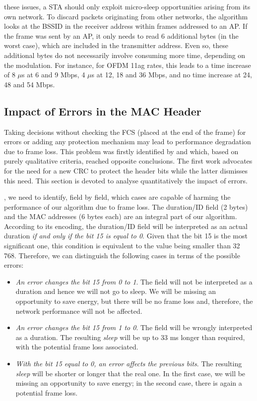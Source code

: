 \documentclass[twoside,nohyper]{tufte-book}
\providecommand{\tightlist}{%
  \setlength{\itemsep}{0pt}\setlength{\parskip}{0pt}}
\begin{document}
 these issues, a STA should only exploit micro-sleep opportunities arising from its own network. To discard packets originating from other networks, the algorithm looks at the BSSID in the receiver address within frames addressed to an AP. If the frame was sent by an AP, it only needs to read 6 additional bytes (in the worst case), which are included in the transmitter address. Even so, these additional bytes do not necessarily involve consuming more time, depending on the modulation. For instance, for OFDM 11ag rates, this leads to a time increase of 8 \(\mu\)s at 6 and 9 Mbps, 4 \(\mu\)s at 12, 18 and 36 Mbps, and no time increase at 24, 48 and 54 Mbps.

\hypertarget{impact-of-errors-in-the-mac-header}{%
\subsection{Impact of Errors in the MAC Header}\label{impact-of-errors-in-the-mac-header}}

Taking decisions without checking the FCS (placed at the end of the frame) for errors or adding any protection mechanism may lead to performance degradation due to frame loss. This problem was firstly identified by \citet{Balaji2010}\cite{Balaji2010} and \citet{Prasad2014}\cite{Prasad2014} which, based on purely qualitative criteria, reached opposite conclusions. The first work advocates for the need for a new CRC to protect the header bits while the latter dismisses this need. This section is devoted to analyse quantitatively the impact of errors.

, we need to identify, field by field, which cases are capable of harming the performance of our algorithm due to frame loss. The duration/ID field (2 bytes) and the MAC addresses (6 bytes each) are an integral part of our algorithm. According to its encoding, the duration/ID field will be interpreted as an actual duration \emph{if and only if the bit 15 is equal to 0}. Given that the bit 15 is the most significant one, this condition is equivalent to the value being smaller than 32 768. Therefore, we can distinguish the following cases in terms of the possible errors:

\begin{itemize}
\tightlist
\item
  \emph{An error changes the bit 15 from 0 to 1}. The field will not be interpreted as a duration and hence we will not go to sleep. We will be missing an opportunity to save energy, but there will be no frame loss and, therefore, the network performance will not be affected.
\item
  \emph{An error changes the bit 15 from 1 to 0}. The field will be wrongly interpreted as a duration. The resulting \emph{sleep} will be up to 33 ms longer than required, with the potential frame loss associated.
\item
  \emph{With the bit 15 equal to 0, an error affects the previous bits}. The resulting \emph{sleep} will be shorter or longer that the real one. In the first case, we will be missing an opportunity to save energy; in the second case, there is again a potential frame loss.
\end{itemize}
\end{document}

